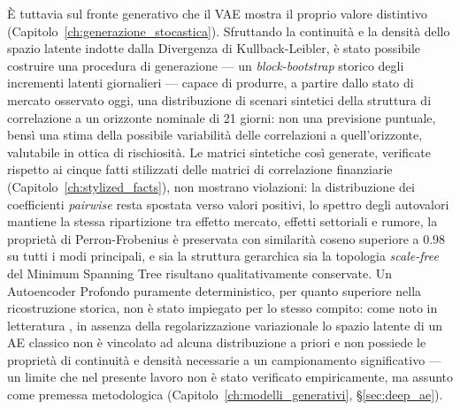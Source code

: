 È tuttavia sul fronte generativo che il VAE mostra il proprio valore distintivo (Capitolo~\ref{ch:generazione_stocastica}). Sfruttando la continuità e la densità dello spazio latente indotte dalla Divergenza di Kullback-Leibler, è stato possibile costruire una procedura di generazione --- un \emph{block-bootstrap} storico degli incrementi latenti giornalieri --- capace di produrre, a partire dallo stato di mercato osservato oggi, una distribuzione di scenari sintetici della struttura di correlazione a un orizzonte nominale di 21 giorni: non una previsione puntuale, bensì una stima della possibile variabilità delle correlazioni a quell'orizzonte, valutabile in ottica di rischiosità. Le matrici sintetiche così generate, verificate rispetto ai cinque fatti stilizzati delle matrici di correlazione finanziarie (Capitolo~\ref{ch:stylized_facts}), non mostrano violazioni: la distribuzione dei coefficienti \emph{pairwise} resta spostata verso valori positivi, lo spettro degli autovalori mantiene la stessa ripartizione tra effetto mercato, effetti settoriali e rumore, la proprietà di Perron-Frobenius è preservata con similarità coseno superiore a 0.98 su tutti i modi principali, e sia la struttura gerarchica sia la topologia \emph{scale-free} del Minimum Spanning Tree risultano qualitativamente conservate. Un Autoencoder Profondo puramente deterministico, per quanto superiore nella ricostruzione storica, non è stato impiegato per lo stesso compito: come noto in letteratura \citep{kingma2013vae, doersch2016vae, burgess2018understanding}, in assenza della regolarizzazione variazionale lo spazio latente di un AE classico non è vincolato ad alcuna distribuzione a priori e non possiede le proprietà di continuità e densità necessarie a un campionamento significativo --- un limite che nel presente lavoro non è stato verificato empiricamente, ma assunto come premessa metodologica (Capitolo~\ref{ch:modelli_generativi}, \S\ref{sec:deep_ae}).

